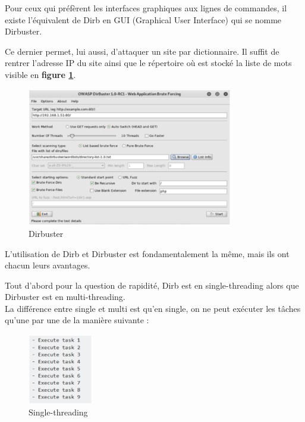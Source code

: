 Pour ceux qui préfèrent les interfaces graphiques aux lignes de commandes, il existe l'équivalent de Dirb en GUI (Graphical User Interface) qui se nomme Dirbuster.

Ce dernier permet, lui aussi, d’attaquer un site par dictionnaire. Il suffit de rentrer l'adresse IP du site ainsi que le répertoire où est stocké la liste de mots visible en \textbf{figure \ref{fig:dirbuster}}. 

\begin{figure}[htp!]
  \centering
  \setlength\figureheight{7cm}
  \setlength\figurewidth{9cm}
  \includegraphics[width=0.8\textwidth]{oui/Ancien/imangeancien/dirb1.PNG}
  \caption{Dirbuster}
  \label{fig:dirbuster}
\end{figure}

L’utilisation de Dirb et Dirbuster est fondamentalement la même, mais ils ont chacun leurs avantages. 

Tout d’abord pour la question de rapidité, Dirb est en single-threading alors que Dirbuster est en multi-threading. \\
La différence entre single et multi est qu’en single, on ne peut exécuter les tâches qu’une par une de la manière suivante : 
\begin{center}
   \begin{figure}[htp!]
  \centering
  \setlength\figureheight{7cm}
  \setlength\figurewidth{9cm}
  \includegraphics[width=0.25\textwidth]{oui/Ancien/imangeancien/dirb3.PNG}
  \caption{Single-threading}
  \label{fig:courbe-tikz}
\end{figure} 
\end{center}

